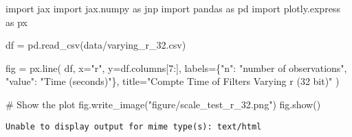 \documentclass[
]{report}
\newenvironment{Shaded}{\begin{snugshade}}{\end{snugshade}}
\newcommand{\CommentTok}[1]{\textcolor[rgb]{0.37,0.37,0.37}{#1}}
\newcommand{\DecValTok}[1]{\textcolor[rgb]{0.68,0.00,0.00}{#1}}
\newcommand{\ImportTok}[1]{\textcolor[rgb]{0.00,0.46,0.62}{#1}}
\newcommand{\NormalTok}[1]{\textcolor[rgb]{0.00,0.23,0.31}{#1}}
\newcommand{\OperatorTok}[1]{\textcolor[rgb]{0.37,0.37,0.37}{#1}}
\newcommand{\StringTok}[1]{\textcolor[rgb]{0.13,0.47,0.30}{#1}}
\begin{document}
\begin{Shaded}
\begin{Highlighting}[]
\ImportTok{import}\NormalTok{ jax}
\ImportTok{import}\NormalTok{ jax.numpy }\ImportTok{as}\NormalTok{ jnp}
\ImportTok{import}\NormalTok{ pandas }\ImportTok{as}\NormalTok{ pd}
\ImportTok{import}\NormalTok{ plotly.express }\ImportTok{as}\NormalTok{ px}

\NormalTok{df }\OperatorTok{=}\NormalTok{ pd.read\_csv(}\StringTok{\textquotesingle{}data/varying\_r\_32.csv\textquotesingle{}}\NormalTok{)}

\NormalTok{fig }\OperatorTok{=}\NormalTok{ px.line(}
\NormalTok{    df, }
\NormalTok{    x}\OperatorTok{=}\StringTok{"r"}\NormalTok{,}
\NormalTok{    y}\OperatorTok{=}\NormalTok{df.columns[}\DecValTok{7}\NormalTok{:], }
\NormalTok{    labels}\OperatorTok{=}\NormalTok{\{}\StringTok{"n"}\NormalTok{: }\StringTok{"number of observations"}\NormalTok{, }\StringTok{"value"}\NormalTok{: }\StringTok{"Time (seconds)"}\NormalTok{\},}
\NormalTok{    title}\OperatorTok{=}\StringTok{"Compte Time of Filters Varying r (32 bit)"}
\NormalTok{)}

\CommentTok{\# Show the plot}
\NormalTok{fig.write\_image(}\StringTok{"figure/scale\_test\_r\_32.png"}\NormalTok{)}
\NormalTok{fig.show()}
\end{Highlighting}
\end{Shaded}

\begin{verbatim}
Unable to display output for mime type(s): text/html
\end{verbatim}
\end{document}
